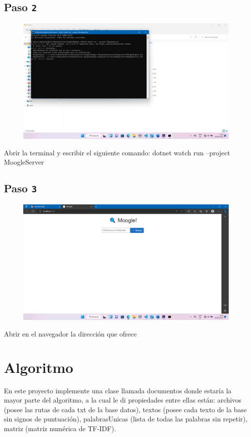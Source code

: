 \documentclass [a4paper,12pt]{article}
\begin{document}
\subsection{Paso \texttt{2}}\label{sub:center}
\begin{figure}[h]
	\center
	\includegraphics[width = 14cm]{Terminal.png}
	\label{fig:terminal}
\end{figure}
Abrir la terminal y escribir el siguiente comando:
dotnet watch run --project MoogleServer
\subsection{Paso \texttt{3}}\label{sub:center}
\begin{figure}[h]
	\center
	\includegraphics[width = 14cm]{Navegador.png}
	\label{fig:navegador}
\end{figure}
Abrir en el navegador la dirección que ofrece
\newpage
\section{Algoritmo}\label{sec:algoritmo}
En este proyecto implemente una clase llamada documentos donde estaría la mayor parte del algoritmo, a la cual le di propiedades entre ellas están: archivos (posee las rutas de cada txt de la base datos), textos (posee cada texto de la base sin signos de puntuación), palabrasUnicas (lista de todas las palabras sin repetir), matriz (matriz numérica de TF-IDF). 
\end{document}
